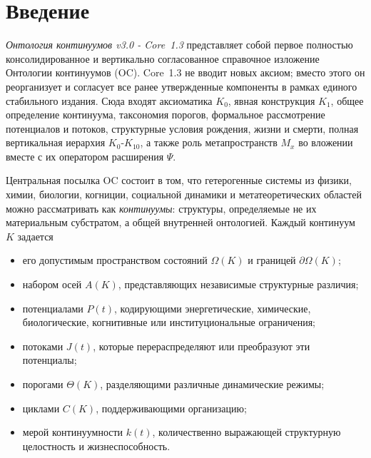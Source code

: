 \section{Введение}
\label{sec:intro}

\emph{Онтология континуумов v3.0 - Core~1.3} представляет собой первое полностью консолидированное и вертикально согласованное справочное изложение Онтологии континуумов (OC). Core~1.3 не вводит новых аксиом; вместо этого он реорганизует и согласует все ранее утвержденные компоненты в рамках единого стабильного издания. Сюда входят аксиоматика \(K_0\), явная конструкция \(K_1\), общее определение континуума, таксономия порогов, формальное рассмотрение потенциалов и потоков, структурные условия рождения, жизни и смерти, полная вертикальная иерархия \(K_0\)-\(K_{10}\), а также роль метапространств \(M_x\) во вложении вместе с их оператором расширения \(\Psi\).

Центральная посылка OC состоит в том, что гетерогенные системы из физики, химии, биологии, когниции, социальной динамики и метатеоретических областей можно рассматривать как \emph{континуумы}: структуры, определяемые не их материальным субстратом, а общей внутренней онтологией. Каждый континуум \(K\) задается

\begin{itemize}
    \item его допустимым пространством состояний \(\Omega(K)\) и границей \(\partial\Omega(K)\);
    \item набором осей \(A(K)\), представляющих независимые структурные различия;
    \item потенциалами \(P(t)\), кодирующими энергетические, химические, биологические, когнитивные или институциональные ограничения;
    \item потоками \(J(t)\), которые перераспределяют или преобразуют эти потенциалы;
    \item порогами \(\Theta(K)\), разделяющими различные динамические режимы;
    \item циклами \(C(K)\), поддерживающими организацию;
    \item мерой континуумности \(k(t)\), количественно выражающей структурную целостность и жизнеспособность.
\end{itemize}

